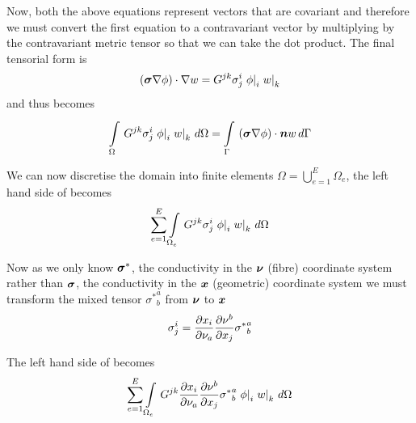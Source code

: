 Now, both the above equations represent vectors that are covariant and therefore we must convert the
first equation to a contravariant vector by multiplying by the contravariant
metric tensor so that we can take the dot product. The final tensorial form is
\begin{equation}
  \left( \boldsymbol{\sigma}\nabla\phi \right)\cdot\nabla w = G^{jk}\sigma^{i}_{j} \left. \phi \right|_{i}  \left. w \right|_{k} 
\end{equation}
and thus  becomes
\begin{equation}
  \gint{\Omega}{}{G^{jk}\sigma^{i}_{j}\covarderiv{\phi}{i}\covarderiv{w}{k}}{\Omega}=
  \gint{\Gamma}{}{\dotprod{\pbrac{\tensor{\sigma}\grad\phi}}{\vect{n}w}}{\Gamma}
  \label{eqn:Laplaceweightedresidualtensorform}
\end{equation}

We can now discretise the domain into finite elements \ie $\Omega=
\displaystyle{\bigcup_{e=1}^{E}}\Omega_{e}$, the left hand side of
 becomes
\begin{equation}
  \displaystyle\sum_{e=1}^{E}  \displaystyle\int\limits_{\Omega_{e}}^{} \,G^{jk}\sigma^{i}_{j} \left. \phi \right|_{i}  \left. w \right|_{k} \,d\Omega 
\end{equation}

Now as we only know $\boldsymbol{\sigma}^{*}$, the conductivity in the
$\vect{\nu}$ (fibre) coordinate system rather than $\boldsymbol{\sigma}$, the
conductivity in the $\vect{x}$ (geometric) coordinate system we must transform the mixed
tensor ${\sigma^{*}}^{a}_{b}$ from $\vect{\nu}$ to $\vect{x}$
\begin{equation}
  \sigma^{i}_{j}= \dfrac{\partial x_{i}}{\partial \nu_{a}}  \dfrac{\partial \nu^{b}}{\partial x_{j}} {\sigma^{*}}^{a}_{b}
\end{equation}

The left hand side of  becomes
\begin{equation}
  \displaystyle\sum_{e=1}^{E}  \displaystyle\int\limits_{\Omega_{e}}^{} \,G^{jk} \dfrac{\partial x_{i}}{\partial \nu_{a}}  \dfrac{\partial \nu^{b}}{\partial x_{j}} {\sigma^{*}}^{a}_{b} \left. \phi \right|_{i}  \left. w \right|_{k} \,d\Omega 
\end{equation}

